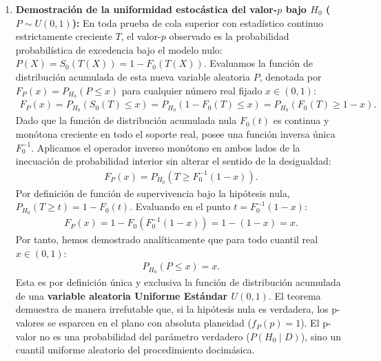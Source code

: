 \begin{solproblema}
	\begin{enumerate}
		\item \textbf{Demostración de la uniformidad estocástica del valor-$p$ bajo $H_0$ ($P \sim U(0,1)$):}
		En toda prueba de cola superior con estadístico continuo estrictamente creciente $T$, el valor-$p$ observado es la probabilidad probabilística de excedencia bajo el modelo nulo: $P(X) = S_0(T(X)) = 1 - F_0(T(X))$.
		Evaluamos la función de distribución acumulada de esta nueva variable aleatoria $P$, denotada por $F_P(x) = P_{H_0}(P \le x)$ para cualquier número real fijado $x \in (0,1)$:
		\begin{align}
			F_P(x) = P_{H_0}\left( S_0(T) \le x \right) = P_{H_0}\left( 1 - F_0(T) \le x \right) = P_{H_0}\left( F_0(T) \ge 1 - x \right).
		\end{align}
		Dado que la función de distribución acumulada nula $F_0(t)$ es continua y monótona creciente en todo el soporte real, posee una función inversa única $F_0^{-1}$. Aplicamos el operador inverso monótono en ambos lados de la inecuación de probabilidad interior sin alterar el sentido de la desigualdad:
		\begin{align}
			F_P(x) = P_{H_0}\left( T \ge F_0^{-1}(1 - x) \right).
		\end{align}
		Por definición de función de supervivencia bajo la hipótesis nula, $P_{H_0}(T \ge t) = 1 - F_0(t)$. Evaluando en el punto $t = F_0^{-1}(1 - x)$:
		\begin{align}
			F_P(x) = 1 - F_0\left( F_0^{-1}(1 - x) \right) = 1 - (1 - x) = x.
		\end{align}
		Por tanto, hemos demostrado analíticamente que para todo cuantil real $x \in (0,1)$:
		\begin{align}
			P_{H_0}(P \le x) = x.
		\end{align}
		Esta es por definición única y exclusiva la función de distribución acumulada de una \textbf{variable aleatoria Uniforme Estándar $U(0,1)$}. El teorema demuestra de manera irrefutable que, si la hipótesis nula es verdadera, los p-valores se esparcen en el plano con absoluta planeidad ($f_P(p) = 1$). El p-valor no es una probabilidad del parámetro verdadero ($P(H_0 \mid D)$), sino un cuantil uniforme aleatorio del procedimiento docimásica.
		

\end{enumerate}
\end{solproblema}
